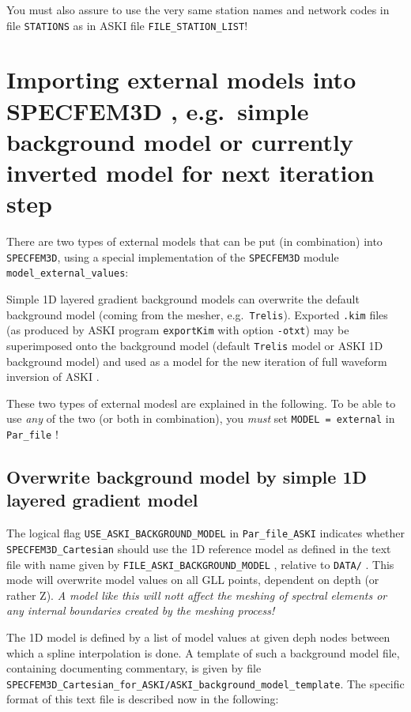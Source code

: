 \documentclass[12pt,a4paper]{article}
\newcommand{\lcode}[1]{\nolinkurl{#1}}
\newcommand{\lcodetitle}[1]{ {\ttfamily #1} }
\newcommand{\ASKI}{ {\ttfamily ASKI} }
\begin{document}
You must also assure to use the very same station names and network codes in file \lcode{STATIONS} as in 
\ASKI file \lcode{FILE_STATION_LIST}!
%
\section{Importing external models into \lcodetitle{SPECFEM3D}, e.g.\ simple background model or currently inverted model for next iteration step} \label{import_model}
%
There are two types of external models that can be put (in combination) into \lcode{SPECFEM3D}, 
using a special implementation of the \lcode{SPECFEM3D} module \lcode{model_external_values}:

Simple 1D layered gradient background models can overwrite the default background model (coming from the mesher, e.g.\ \lcode{Trelis}).
Exported \lcode{.kim} files (as produced by \ASKI program \lcode{exportKim} with option \lcode{-otxt}) may be 
superimposed onto the background model (default \lcode{Trelis} model or \ASKI 1D background model) and used as a model for
the new iteration of full waveform inversion of \ASKI. 

These two types of external modesl are explained in the following.
To be able to use \emph{any} of the two (or both in combination), you \emph{must} set \lcode{MODEL = external} in \lcode{Par_file} !

\subsection{Overwrite background model by simple 1D layered gradient model} \label{import_model:ssec_1D}
The logical flag \lcode{USE_ASKI_BACKGROUND_MODEL} in \lcode{Par_file_ASKI} indicates whether 
\lcode{SPECFEM3D_Cartesian} should use the 1D reference model as defined in the text file with name given by 
\lcode{FILE_ASKI_BACKGROUND_MODEL} , relative to \lcode{DATA/} .
This mode will overwrite model values on all GLL points, dependent on depth (or rather Z). 
\emph{A model like this will nott affect the meshing of spectral elements or any internal boundaries created
by the meshing process!}

The 1D model is defined by a list of model values at given deph nodes between which a spline interpolation 
is done. 
A template of such a background model file, containing documenting commentary, is given by file 
\lcode{SPECFEM3D_Cartesian_for_ASKI/ASKI_background_model_template}.
The specific format of this text file is described now in the following:
\end{document}
